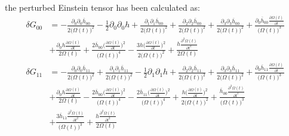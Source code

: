 \documentclass[10pt,letterpaper]{article}
\begin{document}
\ee
the perturbed Einstein tensor has been calculated as:
\begin{align}
	\delta  G_{00} &= - \frac{\partial_{0}\partial_{0}\overline{h}_{00}}{2 \bigl(\Omega(t)\bigr)^2} -  \tfrac{1}{2} \partial_{0}\partial_{0}h + \frac{\partial_{1}\partial_{1}\overline{h}_{00}}{2 \bigl(\Omega(t)\bigr)^2} + \frac{\partial_{2}\partial_{2}\overline{h}_{00}}{2 \bigl(\Omega(t)\bigr)^2} + \frac{\partial_{3}\partial_{3}\overline{h}_{00}}{2 \bigl(\Omega(t)\bigr)^2} + \frac{\partial_{0}\overline{h}_{00} \frac{\partial \Omega(t)}{\partial t}}{\bigl(\Omega(t)\bigr)^3} \\
&+ \frac{\partial_{0}h \frac{\partial \Omega(t)}{\partial t}}{2 \Omega(t)} + \frac{2 \overline{h}_{00} \bigl(\frac{\partial \Omega(t)}{\partial t}\bigr)^2}{\bigl(\Omega(t)\bigr)^4} -  \frac{3 h \bigl(\frac{\partial \Omega(t)}{\partial t}\bigr)^2}{2 \bigl(\Omega(t)\bigr)^2} + \frac{h \frac{\partial^{2}\Omega(t)}{\partial t^{2}}}{2 \Omega(t)}
\end{align}
\begin{align}
	\delta  G_{11} &= - \frac{\partial_{0}\partial_{0}\overline{h}_{11}}{2 \bigl(\Omega(t)\bigr)^2} + \frac{\partial_{1}\partial_{1}\overline{h}_{11}}{2 \bigl(\Omega(t)\bigr)^2} -  \tfrac{1}{2} \partial_{1}\partial_{1}h + \frac{\partial_{2}\partial_{2}\overline{h}_{11}}{2 \bigl(\Omega(t)\bigr)^2} + \frac{\partial_{3}\partial_{3}\overline{h}_{11}}{2 \bigl(\Omega(t)\bigr)^2} + \frac{\partial_{0}\overline{h}_{11} \frac{\partial \Omega(t)}{\partial t}}{\bigl(\Omega(t)\bigr)^3} \\
&+ \frac{\partial_{0}h \frac{\partial \Omega(t)}{\partial t}}{2 \Omega(t)} -  \frac{2 \overline{h}_{00} \bigl(\frac{\partial \Omega(t)}{\partial t}\bigr)^2}{\bigl(\Omega(t)\bigr)^4} -  \frac{2 \overline{h}_{11} \bigl(\frac{\partial \Omega(t)}{\partial t}\bigr)^2}{\bigl(\Omega(t)\bigr)^4} + \frac{h \bigl(\frac{\partial \Omega(t)}{\partial t}\bigr)^2}{2 \bigl(\Omega(t)\bigr)^2} + \frac{\overline{h}_{00} \frac{\partial^{2}\Omega(t)}{\partial t^{2}}}{\bigl(\Omega(t)\bigr)^3}\\
&+ \frac{3 \overline{h}_{11} \frac{\partial^{2}\Omega(t)}{\partial t^{2}}}{\bigl(\Omega(t)\bigr)^3} + \frac{h \frac{\partial^{2}\Omega(t)}{\partial t^{2}}}{2 \Omega(t)}
\end{align}
\end{document}
